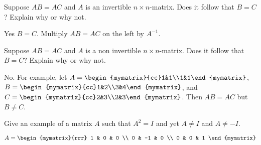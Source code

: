 \begin{enumialphparenastyle}
\begin{ex}
  Suppose $AB=AC$ and $A$ is an invertible $n\times n$-matrix. Does it
  follow that $B=C$? Explain why or why not.
  \begin{sol}
    Yes $B=C$. Multiply $AB = AC$ on the left by $A^{-1}$. 
  \end{sol}
\end{ex}

\begin{ex}
  Suppose $AB=AC$ and $A$ is a non invertible $n\times n$-matrix. Does
  it follow that $B=C$? Explain why or why not.
  \begin{sol}
    No. For example, let
    $A=\begin{mymatrix}{cc}1&1\\1&1\end{mymatrix}$,
    $B=\begin{mymatrix}{cc}1&2\\3&4\end{mymatrix}$, and
    $C=\begin{mymatrix}{cc}2&3\\2&3\end{mymatrix}$. Then $AB=AC$ but
    $B\neq C$.
  \end{sol}
\end{ex}

\begin{ex}
  Give an example of a matrix $A$ such that $A^{2}=I$ and yet
  $A\neq I$ and $A\neq -I$.
  \begin{sol}
    $A = \begin{mymatrix}{rrr}
      1 & 0 & 0 \\
      0 & -1 & 0 \\
      0 & 0 & 1
    \end{mymatrix} $
  \end{sol}
\end{ex}

\end{enumialphparenastyle}
